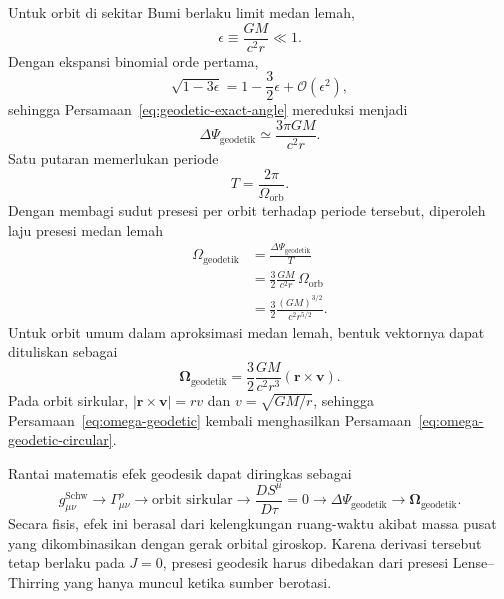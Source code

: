 Untuk orbit di sekitar Bumi berlaku limit medan lemah,
\begin{equation}
    \epsilon
    \equiv\frac{GM}{c^2r}
    \ll1.
    \label{eq:geodetic-weak-parameter}
\end{equation}
Dengan ekspansi binomial orde pertama,
\begin{equation}
    \sqrt{1-3\epsilon}
    =1-\frac{3}{2}\epsilon+\mathcal{O}(\epsilon^2),
\end{equation}
sehingga Persamaan~\eqref{eq:geodetic-exact-angle} mereduksi menjadi
\begin{equation}
    \Delta\Psi_{\mathrm{geodetik}}
    \simeq
    \frac{3\pi GM}{c^2r}.
    \label{eq:geodetic-angle-weak}
\end{equation}
Satu putaran memerlukan periode
\begin{equation}
    T=\frac{2\pi}{\Omega_{\mathrm{orb}}}.
\end{equation}
Dengan membagi sudut presesi per orbit terhadap periode tersebut,
diperoleh laju presesi medan lemah
\begin{equation}
\begin{split}
    \Omega_{\mathrm{geodetik}}
    &=\frac{\Delta\Psi_{\mathrm{geodetik}}}{T}\\
    &=\frac{3}{2}\frac{GM}{c^2r}\,\Omega_{\mathrm{orb}}\\
    &=\frac{3}{2}\frac{(GM)^{3/2}}{c^2r^{5/2}}.
\end{split}
    \label{eq:omega-geodetic-circular}
\end{equation}
Untuk orbit umum dalam aproksimasi medan lemah, bentuk vektornya dapat
dituliskan sebagai \parencite{Will2014Confrontation}
\begin{equation}
    \bm{\Omega}_{\mathrm{geodetik}}
    =\frac{3}{2}\frac{GM}{c^2r^3}
    \left(\mathbf{r}\times\mathbf{v}\right).
    \label{eq:omega-geodetic}
\end{equation}
Pada orbit sirkular, $|\mathbf{r}\times\mathbf{v}|=rv$ dan
$v=\sqrt{GM/r}$, sehingga Persamaan~\eqref{eq:omega-geodetic} kembali
menghasilkan Persamaan~\eqref{eq:omega-geodetic-circular}.

Rantai matematis efek geodesik dapat diringkas sebagai
\begin{equation}
    g_{\mu\nu}^{\mathrm{Schw}}
    \longrightarrow
    \Gamma^\rho_{\mu\nu}
    \longrightarrow
    \text{orbit sirkular}
    \longrightarrow
    \frac{DS^\mu}{D\tau}=0
    \longrightarrow
    \Delta\Psi_{\mathrm{geodetik}}
    \longrightarrow
    \bm{\Omega}_{\mathrm{geodetik}}.
    \label{eq:geodetic-chain}
\end{equation}
Secara fisis, efek ini berasal dari kelengkungan ruang-waktu akibat massa
pusat yang dikombinasikan dengan gerak orbital giroskop. Karena derivasi
tersebut tetap berlaku pada $J=0$, presesi geodesik harus dibedakan dari
presesi Lense--Thirring yang hanya muncul ketika sumber berotasi.


